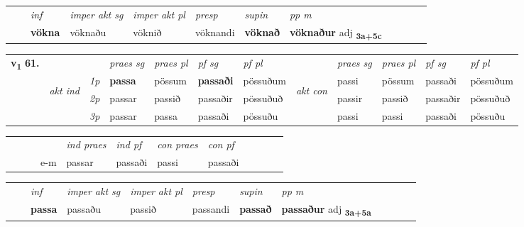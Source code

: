 \begin{tabular}{llllllllllll}
 & & \textit{inf} & \textit{imper akt sg} & \textit{imper akt pl}   & \textit{presp} & \textit{supin}  & \textit{pp m}     \\*
  & & \textbf{vökna} & vöknaðu  & vöknið   & vöknandi &  \textbf{vöknað}  & \textbf{vöknaður} adj \textbf{\textsubscript{3a+5c}} \\*
\cmidrule{1-12}
\end{tabular}



\begin{tabular}{llllllllllll} \toprule
\multirow{4}{*}{{{\textbf{v{\textsubscript{1}}} \Large{\textbf{61.}}}}}  & &   &  \textit{praes sg}  & \textit{praes pl}  &\textit{ pf sg} & \textit{pf pl} &  &  \textit{praes sg}  & \textit{praes pl}  & \textit{pf sg} & \textit{pf pl } \\*
	\cmidrule{4-7} \cmidrule{9-12}
 & \multirow{3}{*}{\begin{turn}{90}\textit{akt ind}\end{turn}} & {\textit{1p}} & \textbf{passa} & pössum    & \textbf{passaði} & pössuðum & \multirow{3}{*}{\begin{turn}{90}\textit{akt con}\end{turn}} &passi & pössum & passaði & pössuðum\\*
& &  {\textit{2p}} &  passar  & passið   & passaðir & pössuðuð & & passir & passið & passaðir & pössuðuð \\*
& &  {\textit{3p}} & passar & passa   & passaði & pössuðu & & passi & passi& passaði & pössuðu  \\*
\cmidrule{4-7} \cmidrule{9-12}
\end{tabular}


\begin{tabular}{llllllllllll}
 & &  & &  \textit{ind praes} & \textit{ind pf} & \textit{con praes} & \textit{con pf} \\*
&  & & e-m & passar & passaði & passi & passaði \\*
\cmidrule{5-9}
\end{tabular}


\begin{tabular}{llllllllllll}
 & & \textit{inf} & \textit{imper akt sg} & \textit{imper akt pl}   & \textit{presp} & \textit{supin}  & \textit{pp m}     \\*
  & & \textbf{passa} & passaðu  & passið   & passandi &  \textbf{passað}  & \textbf{passaður} adj \textbf{\textsubscript{3a+5a}} \\*
\cmidrule{1-12}
\end{tabular}



